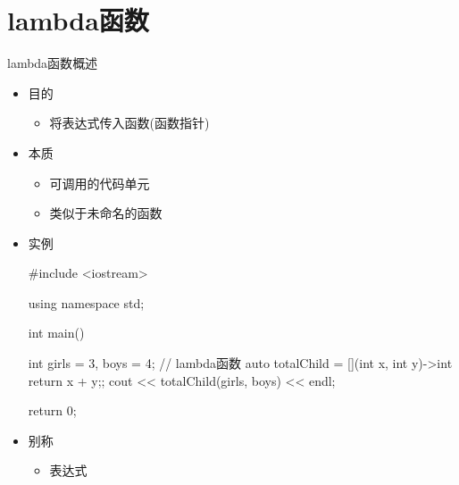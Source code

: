 \section[lambda函数]{lambda函数}
\begin{frame}[fragile]{lambda函数}{概述}%
  \stretchon
  \begin{itemize}
  \item 目的
    \begin{itemize}
    \item 将表达式传入函数(函数指针)
    \end{itemize}
  \item 本质
    \begin{itemize}
    \item 可调用的代码单元
    \item 类似于未命名的函数
    \end{itemize}
  \item 实例
    \begin{cppcode}
#include <iostream>

using namespace std;

int main()
{
  int girls = 3, boys = 4;
  // lambda函数
  auto totalChild = [](int x, int y)->int {return x + y;};
  cout << totalChild(girls, boys) << endl;

  return 0;
}
   \end{cppcode}
  \item 别称
    \begin{itemize}
    \item {}表达式
    \end{itemize}
  \end{itemize}
  \stretchoff
\end{frame}

